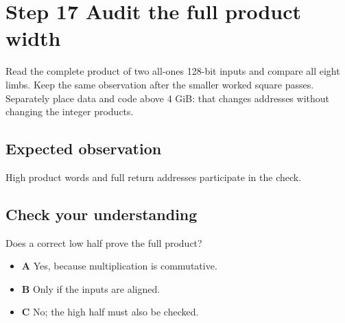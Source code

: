 \section{Step 17 Audit the full product width}\label{rsa-s17}

Read the complete product of two all-ones 128-bit inputs and compare all eight limbs. Keep the same observation after the smaller worked square passes. Separately place data and code above 4 GiB: that changes addresses without changing the integer products.

\subsection{Expected observation}
High product words and full return addresses participate in the check.

\subsection{Check your understanding}
Does a correct low half prove the full product?

\begin{itemize}
\item \textbf{A} Yes, because multiplication is commutative.
\item \textbf{B} Only if the inputs are aligned.
\item \textbf{C} No; the high half must also be checked.
\end{itemize}
